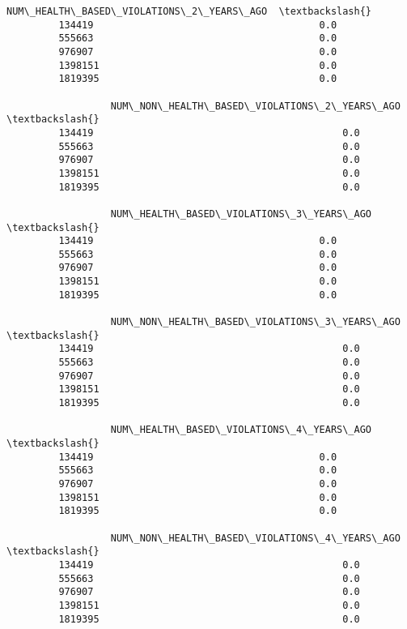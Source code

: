 \documentclass[11pt]{article}
\begin{document}
\begin{Verbatim}[commandchars=\\\{\}]
                  NUM\_HEALTH\_BASED\_VIOLATIONS\_2\_YEARS\_AGO  \textbackslash{}
         134419                                       0.0   
         555663                                       0.0   
         976907                                       0.0   
         1398151                                      0.0   
         1819395                                      0.0   
         
                  NUM\_NON\_HEALTH\_BASED\_VIOLATIONS\_2\_YEARS\_AGO  \textbackslash{}
         134419                                           0.0   
         555663                                           0.0   
         976907                                           0.0   
         1398151                                          0.0   
         1819395                                          0.0   
         
                  NUM\_HEALTH\_BASED\_VIOLATIONS\_3\_YEARS\_AGO  \textbackslash{}
         134419                                       0.0   
         555663                                       0.0   
         976907                                       0.0   
         1398151                                      0.0   
         1819395                                      0.0   
         
                  NUM\_NON\_HEALTH\_BASED\_VIOLATIONS\_3\_YEARS\_AGO  \textbackslash{}
         134419                                           0.0   
         555663                                           0.0   
         976907                                           0.0   
         1398151                                          0.0   
         1819395                                          0.0   
         
                  NUM\_HEALTH\_BASED\_VIOLATIONS\_4\_YEARS\_AGO  \textbackslash{}
         134419                                       0.0   
         555663                                       0.0   
         976907                                       0.0   
         1398151                                      0.0   
         1819395                                      0.0   
         
                  NUM\_NON\_HEALTH\_BASED\_VIOLATIONS\_4\_YEARS\_AGO  \textbackslash{}
         134419                                           0.0   
         555663                                           0.0   
         976907                                           0.0   
         1398151                                          0.0   
         1819395                                          0.0   
         

\end{Verbatim}
\end{document}
